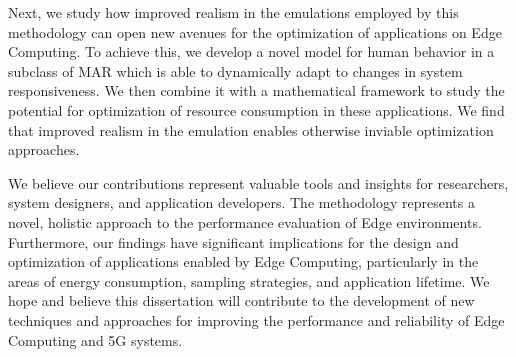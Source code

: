 Next, we study how improved realism in the emulations employed by this methodology can open new avenues for the optimization of applications on Edge Computing.
To achieve this, we develop a novel model for human behavior in a subclass of \gls{MAR} which is able to dynamically adapt to changes in system responsiveness.
We then combine it with a mathematical framework to study the potential for optimization of resource consumption in these applications.
We find that improved realism in the emulation enables otherwise inviable optimization approaches.

We believe our contributions represent valuable tools and insights for researchers, system designers, and application developers.
The methodology represents a novel, holistic approach to the performance evaluation of Edge environments.
Furthermore, our findings have significant implications for the design and optimization of applications enabled by Edge Computing, particularly in the areas of energy consumption, sampling strategies, and application lifetime.
We hope and believe this dissertation will contribute to the development of new techniques and approaches for improving the performance and reliability of Edge Computing and 5G systems.